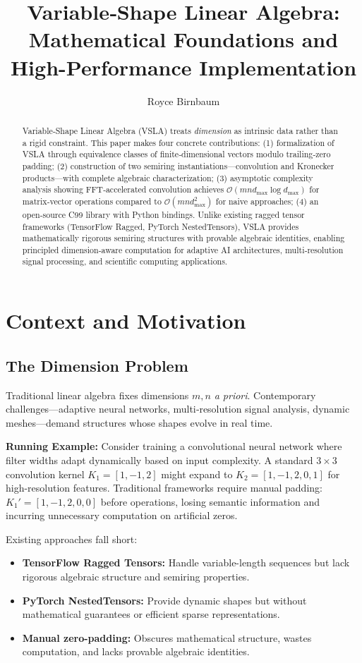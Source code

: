 \documentclass[sigconf,review]{acmart}
\title{Variable‑Shape Linear Algebra: Mathematical Foundations and High-Performance Implementation}
\author{Royce Birnbaum}
\affiliation{%
  \institution{Independent Researcher}
  \country{USA}
}
\begin{document}
\begin{abstract}
Variable‑Shape Linear Algebra (VSLA) treats \emph{dimension} as intrinsic data rather than a rigid constraint. This paper makes four concrete contributions: (1) formalization of VSLA through equivalence classes of finite‑dimensional vectors modulo trailing‑zero padding; (2) construction of two semiring instantiations—convolution and Kronecker products—with complete algebraic characterization; (3) asymptotic complexity analysis showing FFT‑accelerated convolution achieves $\mathcal{O}(mn d_{\max} \log d_{\max})$ for matrix‑vector operations compared to $\mathcal{O}(mn d_{\max}^2)$ for naive approaches; (4) an open‑source C99 library with Python bindings. Unlike existing ragged tensor frameworks (TensorFlow Ragged, PyTorch NestedTensors), VSLA provides mathematically rigorous semiring structures with provable algebraic identities, enabling principled dimension‑aware computation for adaptive AI architectures, multi‑resolution signal processing, and scientific computing applications.
\end{abstract}

\maketitle

\section{Context and Motivation}
\subsection{The Dimension Problem}
Traditional linear algebra fixes dimensions \(m,n\) \emph{a priori}.  Contemporary challenges—adaptive neural networks, multi‑resolution signal analysis, dynamic meshes—demand structures whose shapes evolve in real time.  

\textbf{Running Example:} Consider training a convolutional neural network where filter widths adapt dynamically based on input complexity. A standard $3 \times 3$ convolution kernel $K_1 = [1, -1, 2]$ might expand to $K_2 = [1, -1, 2, 0, 1]$ for high-resolution features. Traditional frameworks require manual padding: $K_1' = [1, -1, 2, 0, 0]$ before operations, losing semantic information and incurring unnecessary computation on artificial zeros.

Existing approaches fall short:
\begin{itemize}[leftmargin=1.5em]
\item \textbf{TensorFlow Ragged Tensors:} Handle variable-length sequences but lack rigorous algebraic structure and semiring properties.
\item \textbf{PyTorch NestedTensors:} Provide dynamic shapes but without mathematical guarantees or efficient sparse representations.
\item \textbf{Manual zero-padding:} Obscures mathematical structure, wastes computation, and lacks provable algebraic identities.
\end{itemize}
\end{document}
